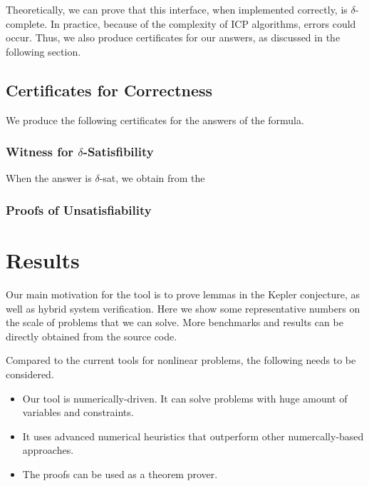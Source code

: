 \documentclass[envcountsect]{llncs}
\begin{document}
Theoretically, we can prove that this interface, when implemented correctly, is
$\delta$-complete. In practice, because of the complexity of ICP algorithms,
errors could occur. Thus, we also produce certificates for our answers, as
discussed in the following section. 

\subsection{Certificates for Correctness}

We produce the following certificates for the answers of the formula. 
\subsubsection{Witness for $\delta$-Satisfibility} When the answer is
$\delta$-sat, we obtain from the 

\subsubsection{Proofs of Unsatisfiability}



\section{Results}

Our main motivation for the tool is to prove lemmas in the Kepler conjecture,
as well as hybrid system verification. Here we show some representative numbers
on the scale of problems that we can solve. More benchmarks and results can be
directly obtained from the source code. 

Compared to the current tools for nonlinear problems, the following needs to be
considered. 
\begin{itemize}
\item Our tool is numerically-driven. It can solve problems with huge amount of variables and constraints. 
\item It uses advanced numerical heuristics that outperform other
numercally-based approaches. 
\item The proofs can be used as a theorem prover. 
\end{itemize}




\end{document}
